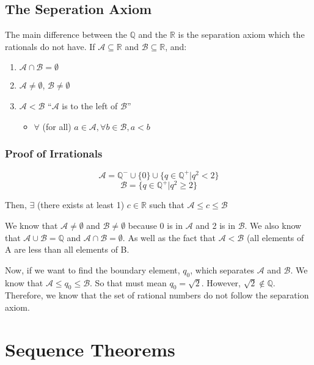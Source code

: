 \documentclass[11 pt, twoside]{article}
\begin{document}
\subsection{The Seperation Axiom}

The main difference between the $\mathbb{Q}$ and the $\mathbb{R}$ is the
separation axiom which the rationals do not have. If $\mathcal{A} \subseteq \mathbb{R}$ and $\mathcal{B} \subseteq \mathbb{R}$, and:

\begin{enumerate}
\item $\mathcal{A} \cap \mathcal{B} = \emptyset$
\item $\mathcal{A} \neq \emptyset$, $\mathcal{B} \neq \emptyset$
\item $\mathcal{A} < \mathcal{B}$ ``$\mathcal{A}$ is to the left of
$\mathcal{B}$''
\begin{itemize}
\item $\forall$ (for all) $a \in \mathcal{A}, \forall b \in \mathcal{B}, a < b$
\end{itemize}
\end{enumerate}

\subsubsection{Proof of Irrationals}

$$\mathcal{A} = \mathbb{Q}^- \cup \{0\} \cup \{q \in \mathbb{Q}^+ | q^2 < 2\}$$
$$\mathcal{B} = \{q \in \mathbb{Q}^+ | q^2 \geq 2\}$$

Then, $\exists$ (there exists at least 1) $c \in \mathbb{R}$ such that $\mathcal{A} \leq c \leq \mathcal{B}$

We know that $\mathcal{A} \neq \emptyset$ and $\mathcal{B} \neq \emptyset$
because 0 is in $\mathcal{A}$ and 2 is in $\mathcal{B}$. We also know that
$\mathcal{A} \cup \mathcal{B} = \mathbb{Q}$ and $\mathcal{A} \cap \mathcal{B}
= \emptyset$. As well as the fact that $\mathcal{A} < \mathcal{B}$ (all elements of A are less than all elements of B.

Now, if we want to find the boundary element, $q_0$, which separates
$\mathcal{A}$ and $\mathcal{B}$. We know that $\mathcal{A} \leq q_0 \leq
\mathcal{B}$. So that must mean $q_0 = \sqrt{2}$. However, $\sqrt{2} \notin
\mathbb{Q}$. Therefore, we know that the set of rational numbers do not
follow the separation axiom.

\section{Sequence Theorems}
\end{document}
